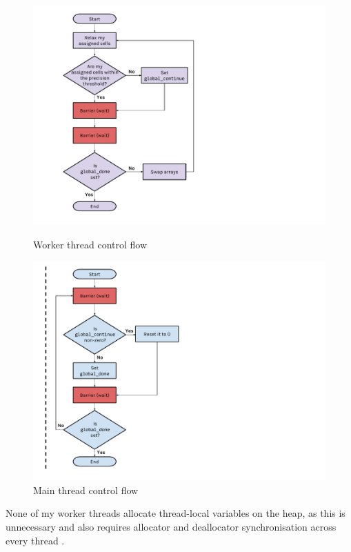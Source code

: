 \documentclass[12pt]{article}
\begin{document}
\begin{figure}[!htb]
    \begin{minipage}{.47\textwidth}
        \hspace{-1.6cm}\includegraphics[width=2.4\textwidth]{img/workersflowchart.pdf}
        \caption{Worker thread control flow}
        \label{fig:workers}
    \end{minipage}\hspace{1.65cm}
    \begin{minipage}{0.47\textwidth}
       \hspace{-1cm}\includegraphics[width=2.4\textwidth]{img/mainflowchart.pdf}
        \caption{Main thread control flow}
        \label{fig:main}
    \end{minipage}
\end{figure}
None of my worker threads allocate thread-local variables on the heap, as this is unnecessary and also requires allocator and deallocator synchronisation across every thread \citep{contention}.
\end{document}
